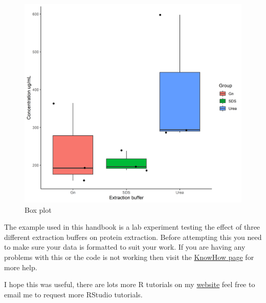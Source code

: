 \documentclass[
]{article}
\begin{document}
\begin{figure}
\centering
\includegraphics{../Images/tendon_extraction_testRES.png}
\caption{Box plot}
\end{figure}

\pagebreak

The example used in this handbook is a lab experiment testing the effect
of three different extraction buffers on protein extraction. Before
attempting this you need to make sure your data is formatted to suit
your work. If you are having any problems with this or the code is not
working then visit the
\href{https://liverpool-knowhow.libcal.com/appointments/statsliverpool}{KnowHow
page} for more help.

I hope this was useful, there are lots more R tutorials on my
\href{https://ajensen14.github.io/}{website} feel free to email me to
request more RStudio tutorials.
\end{document}
